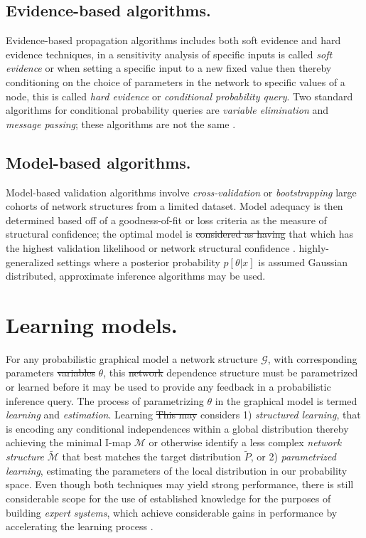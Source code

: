 \documentclass[7pt]{article}
\begin{document}
\subsection{Evidence-based algorithms.}
Evidence-based propagation algorithms includes both soft evidence and hard evidence techniques, in a sensitivity analysis of specific inputs is called  \emph{soft evidence} or when setting a specific input to a new fixed value then thereby conditioning on the choice of parameters in the network to specific values of a node, this is called \emph{hard evidence} or \emph{conditional probability query}. Two standard algorithms for conditional probability queries are \emph{variable elimination} and \emph{message passing}; these algorithms are not the same \cite{cozman2013robustness,castillo2012expert,pearl1988probabilistic}.
	
\subsection{Model-based algorithms.}
Model-based validation algorithms involve \emph{cross-validation} or \emph{bootstrapping} large cohorts of network structures from a limited dataset. Model adequacy is then determined based off of a goodness-of-fit or loss criteria as the measure of structural confidence; the optimal model is \st{considered as having} that which has the  highest  validation likelihood or network structural confidence \cite{koller2009probabilistic,pena2005learning}.  highly-generalized settings where a posterior probability $p[\theta|x]$ is assumed Gaussian distributed, approximate inference algorithms may be used. 

\section{Learning models.}
For any probabilistic graphical model a network structure $\mathcal{G}$, with corresponding {parameters} \st{variables} $\theta$, this \st{network} dependence structure must be parametrized or learned before it may be used to provide any feedback  in a probabilistic inference query. The process of parametrizing $\theta$ in the graphical model is termed \emph{learning} and  \emph{estimation}. Learning  \st{This may} considers 1) \emph{structured learning}, that is encoding any conditional independences within a global distribution thereby achieving the minimal I-map $\mathcal{M}$ or otherwise identify a less complex \emph{network structure} $\tilde{\mathcal{M}}$ that best matches the target distribution ${\tilde{P}}$, or 2) \emph{parametrized learning}, estimating the parameters of the local distribution in our probability space. Even though both techniques may yield strong performance, there is still considerable scope for the use of established knowledge for the purposes of building \emph{expert systems}, which achieve considerable gains in performance by accelerating the learning process \cite{andreassen1996evaluation, beinlich1989alarm, abramson1996hailfinder}.
	
\end{document}
